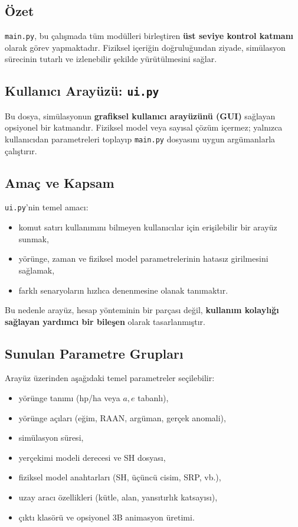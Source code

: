 \subsection*{Özet}
\texttt{main.py}, bu çalışmada
tüm modülleri birleştiren
\textbf{üst seviye kontrol katmanı} olarak görev yapmaktadır.
Fiziksel içeriğin doğruluğundan ziyade,
simülasyon sürecinin tutarlı ve izlenebilir şekilde yürütülmesini sağlar.


\newpage
\subsection{Kullanıcı Arayüzü: \texttt{ui.py}}
\label{subsec:ui_py}

Bu dosya, simülasyonun \textbf{grafiksel kullanıcı arayüzünü (GUI)}
sağlayan opsiyonel bir katmandır.
Fiziksel model veya sayısal çözüm içermez;
yalnızca kullanıcıdan parametreleri toplayıp
\texttt{main.py} dosyasını uygun argümanlarla çalıştırır.

\subsection*{Amaç ve Kapsam}
\texttt{ui.py}’nin temel amacı:
\begin{itemize}
  \item komut satırı kullanımını bilmeyen kullanıcılar için erişilebilir bir arayüz sunmak,
  \item yörünge, zaman ve fiziksel model parametrelerinin hatasız girilmesini sağlamak,
  \item farklı senaryoların hızlıca denenmesine olanak tanımaktır.
\end{itemize}

Bu nedenle arayüz,
hesap yönteminin bir parçası değil,
\textbf{kullanım kolaylığı sağlayan yardımcı bir bileşen} olarak tasarlanmıştır.

\subsection*{Sunulan Parametre Grupları}
Arayüz üzerinden aşağıdaki temel parametreler seçilebilir:
\begin{itemize}
  \item yörünge tanımı (hp/ha veya \(a,e\) tabanlı),
  \item yörünge açıları (eğim, RAAN, argüman, gerçek anomali),
  \item simülasyon süresi,
  \item yerçekimi modeli derecesi ve SH dosyası,
  \item fiziksel model anahtarları (SH, üçüncü cisim, SRP, vb.),
  \item uzay aracı özellikleri (kütle, alan, yansıtırlık katsayısı),
  \item çıktı klasörü ve opsiyonel 3B animasyon üretimi.
\end{itemize}

